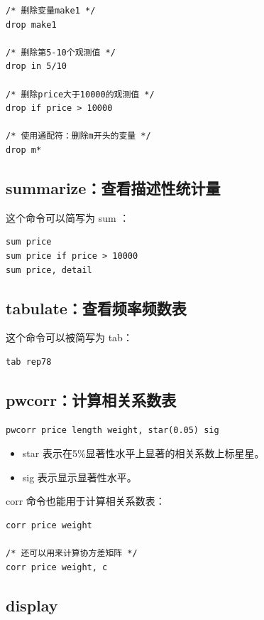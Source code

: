\begin{lstlisting}
/* 删除变量make1 */
drop make1

/* 删除第5-10个观测值 */
drop in 5/10

/* 删除price大于10000的观测值 */
drop if price > 10000

/* 使用通配符：删除m开头的变量 */
drop m*
\end{lstlisting}

\subsection{summarize：查看描述性统计量}

这个命令可以简写为 sum ：

\begin{lstlisting}
sum price
sum price if price > 10000
sum price, detail
\end{lstlisting}

\subsection{tabulate：查看频率频数表}

这个命令可以被简写为 tab：

\begin{lstlisting}
tab rep78
\end{lstlisting}

\subsection{pwcorr：计算相关系数表}

\begin{lstlisting}
pwcorr price length weight, star(0.05) sig
\end{lstlisting}

\begin{itemize}
\item  star 表示在5\%显著性水平上显著的相关系数上标星星。
\item  sig 表示显示显著性水平。
\end{itemize}

corr 命令也能用于计算相关系数表：

\begin{lstlisting}
corr price weight

/* 还可以用来计算协方差矩阵 */
corr price weight, c
\end{lstlisting}

\subsection{display}


